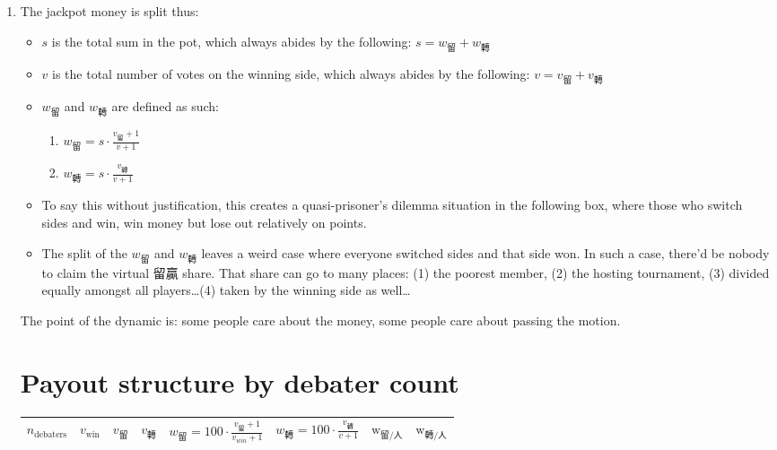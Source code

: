 \begin{enumerate}
    \item The jackpot money is split thus:
    \begin{itemize}
        \item $s$ is the total sum in the pot, which always abides by the following: $s = w_{\text{留}} + w_{\text{轉}}$
        \item $v$ is the total number of votes on the winning side, which always abides by the following: $v = v_{\text{留}} + v_{\text{轉}}$
        \item $w_{\text{留}}$ and $w_{\text{轉}}$ are defined as such:
        \begin{enumerate}
            \item $w_{\text{留}} = s \cdot \frac{v_{\text{留}}+1}{v+1}$
            \item $w_{\text{轉}} = s \cdot \frac{v_{\text{轉}}}{v+1}$
        \end{enumerate}
        \item To say this without justification, this creates a quasi-prisoner's dilemma situation in the following box, where those who switch sides and win, win money but lose out relatively on points.
        \item The split of the $w_{\text{留}}$ and $w_{\text{轉}}$ leaves a weird case where everyone switched sides and that side won. In such a case, there'd be nobody to claim the virtual 留贏 share. That share can go to many places: (1) the poorest member, (2) the hosting tournament, (3) divided equally amongst all players\ldots (4) taken by the winning side as well\ldots
    \end{itemize}







The point of the dynamic is: some people care about the money, some people care about passing the motion.



\section{Payout structure by debater count}

\begin{table}[h]
    \centering
    \small
    \begin{threeparttable}
    \begin{tabular}{cccccccc}    
    \toprule
    $n_{\text{debaters}}$ & $v_{\text{win}}$ & $v_{\text{留}}$ & $v_{\text{轉}}$ & $w_{\text{留}} = 100 \cdot \frac{v_{\text{留}}+1}{v_{win}+1} $ & $w_{\text{轉}} = 100\cdot\frac{v_{\text{轉}}}{v+1}$ & $\text{w}_{\text{留}/\text{人} }$ & $\text{w}_{\text{轉}/\text{人}}$ \\
    \midrule


\end{tabular}
\end{threeparttable}
\end{table}
\end{enumerate}
